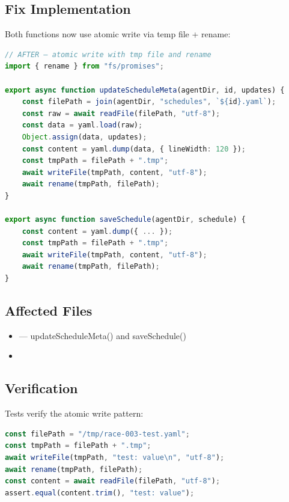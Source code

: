 \subsection*{Fix Implementation}
Both functions now use atomic write via temp file + rename:

\begin{lstlisting}[language=TypeScript]
// AFTER — atomic write with tmp file and rename
import { rename } from "fs/promises";

export async function updateScheduleMeta(agentDir, id, updates) {
    const filePath = join(agentDir, "schedules", `${id}.yaml`);
    const raw = await readFile(filePath, "utf-8");
    const data = yaml.load(raw);
    Object.assign(data, updates);
    const content = yaml.dump(data, { lineWidth: 120 });
    const tmpPath = filePath + ".tmp";
    await writeFile(tmpPath, content, "utf-8");
    await rename(tmpPath, filePath);
}

export async function saveSchedule(agentDir, schedule) {
    const content = yaml.dump({ ... });
    const tmpPath = filePath + ".tmp";
    await writeFile(tmpPath, content, "utf-8");
    await rename(tmpPath, filePath);
}
\end{lstlisting}

\subsection*{Affected Files}
\begin{itemize}
    \item {} — updateScheduleMeta() and saveSchedule()
    \item {}
\end{itemize}

\subsection*{Verification}
Tests verify the atomic write pattern:

\begin{lstlisting}[language=TypeScript]
const filePath = "/tmp/race-003-test.yaml";
const tmpPath = filePath + ".tmp";
await writeFile(tmpPath, "test: value\n", "utf-8");
await rename(tmpPath, filePath);
const content = await readFile(filePath, "utf-8");
assert.equal(content.trim(), "test: value");
\end{lstlisting}

